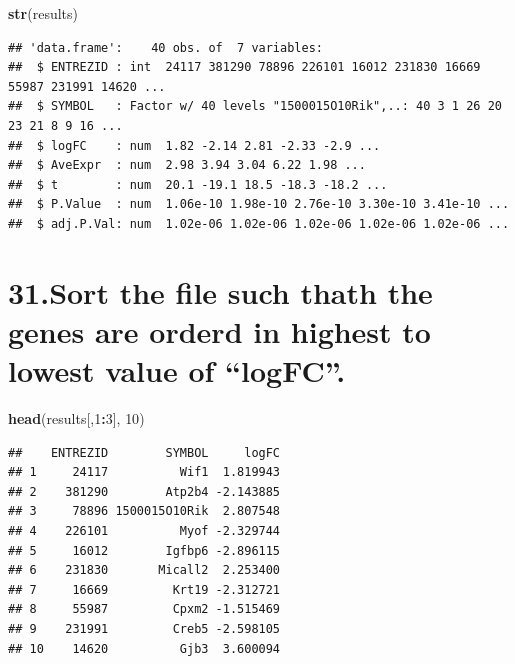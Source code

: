 \documentclass[]{article}
\newenvironment{Shaded}{\begin{snugshade}}{\end{snugshade}}
\newcommand{\DecValTok}[1]{\textcolor[rgb]{0.00,0.00,0.81}{#1}}
\newcommand{\KeywordTok}[1]{\textcolor[rgb]{0.13,0.29,0.53}{\textbf{#1}}}
\newcommand{\NormalTok}[1]{#1}
\newcommand{\OperatorTok}[1]{\textcolor[rgb]{0.81,0.36,0.00}{\textbf{#1}}}
\begin{document}
\begin{Shaded}
\begin{Highlighting}[]
\KeywordTok{str}\NormalTok{(results)}
\end{Highlighting}
\end{Shaded}

\begin{verbatim}
## 'data.frame':    40 obs. of  7 variables:
##  $ ENTREZID : int  24117 381290 78896 226101 16012 231830 16669 55987 231991 14620 ...
##  $ SYMBOL   : Factor w/ 40 levels "1500015O10Rik",..: 40 3 1 26 20 23 21 8 9 16 ...
##  $ logFC    : num  1.82 -2.14 2.81 -2.33 -2.9 ...
##  $ AveExpr  : num  2.98 3.94 3.04 6.22 1.98 ...
##  $ t        : num  20.1 -19.1 18.5 -18.3 -18.2 ...
##  $ P.Value  : num  1.06e-10 1.98e-10 2.76e-10 3.30e-10 3.41e-10 ...
##  $ adj.P.Val: num  1.02e-06 1.02e-06 1.02e-06 1.02e-06 1.02e-06 ...
\end{verbatim}

\hypertarget{sort-the-file-such-thath-the-genes-are-orderd-in-highest-to-lowest-value-of-logfc.}{%
\section{31.Sort the file such thath the genes are orderd in highest to
lowest value of
``logFC''.}\label{sort-the-file-such-thath-the-genes-are-orderd-in-highest-to-lowest-value-of-logfc.}}

\begin{Shaded}
\begin{Highlighting}[]
\KeywordTok{head}\NormalTok{(results[,}\DecValTok{1}\OperatorTok{:}\DecValTok{3}\NormalTok{], }\DecValTok{10}\NormalTok{)}
\end{Highlighting}
\end{Shaded}

\begin{verbatim}
##    ENTREZID        SYMBOL     logFC
## 1     24117          Wif1  1.819943
## 2    381290        Atp2b4 -2.143885
## 3     78896 1500015O10Rik  2.807548
## 4    226101          Myof -2.329744
## 5     16012        Igfbp6 -2.896115
## 6    231830       Micall2  2.253400
## 7     16669         Krt19 -2.312721
## 8     55987         Cpxm2 -1.515469
## 9    231991         Creb5 -2.598105
## 10    14620          Gjb3  3.600094
\end{verbatim}

\begin{Shaded}
\end{Shaded}
\end{document}
